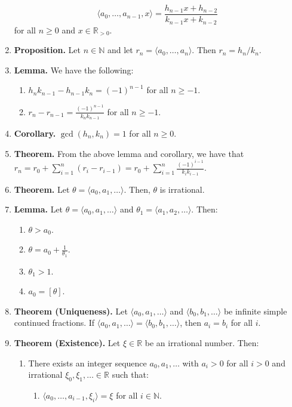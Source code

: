 \documentclass[11pt]{article}
\theoremstyle{definition}
\theoremstyle{named}
\begin{document}
\begin{enumerate}
    $$
    \langle a_0,\dots,a_{n-1},x \rangle = \frac{h_{n-1}x + h_{n-2}}{k_{n-1}x + k_{n-2}}
    $$
    for all $n \geq 0$ and $x \in \mathbb{R}_{>0}$. 
    \item \textbf{Proposition. } Let $n \in \mathbb{N}$ and let $r_n = \langle a_0,\dots,a_n \rangle$. Then $r_n = h_n/k_n$. 
    \item \textbf{Lemma. } We have the following: 
    \begin{enumerate}
        \item $h_nk_{n-1} - h_{n-1}k_n = (-1)^{n-1}$ for all $n \geq -1$. 
        \item $r_n - r_{n-1} = \frac{(-1)^{n-1}}{k_nk_{n-1}}$ for all $n \geq -1$. 
    \end{enumerate}
    \item \textbf{Corollary. } $\gcd(h_n,k_n) = 1$ for all $n \geq 0$. 
    \item \textbf{Theorem. } From the above lemma and corollary, we have that $r_n = r_0 + \sum_{i=1}^{n} (r_i - r_{i-1}) = r_0 + \sum_{i=1}^{n} \frac{(-1)^{i-1}}{k_ik_{i-1}}$. 
    \item \textbf{Theorem. } Let $\theta = \langle a_0,a_1,\dots \rangle$. Then, $\theta$ is irrational. 
    \item \textbf{Lemma. } Let $\theta = \langle a_0,a_1,\dots \rangle$ and $\theta_1 = \langle a_1,a_2,\dots \rangle$. Then: 
    \begin{enumerate}
        \item $\theta > a_0$. 
        \item $\theta = a_0 + \frac{1}{\theta_1}$. 
        \item $\theta_1 > 1$. 
        \item $a_0 = [\theta]$. 
    \end{enumerate}
    \item \textbf{Theorem (Uniqueness). } Let $\langle a_0,a_1,\dots \rangle$ and $\langle b_0,b_1,\dots \rangle$ be infinite simple continued fractions. If $\langle a_0,a_1,\dots \rangle = \langle b_0,b_1,\dots \rangle$, then $a_i = b_i$ for all $i$. 
    \item \textbf{Theorem (Existence). } Let $\xi \in \mathbb{R}$ be an irrational number. Then: 
    \begin{enumerate}
        \item There exists an integer sequence $a_0,a_1,\dots$ with $a_i>0$ for all $i>0$ and irrational $\xi_0,\xi_1,\dots \in \mathbb{R}$ such that:
        \begin{enumerate}
            \item $\langle a_0,\dots,a_{i-1},\xi_i \rangle = \xi$ for all $i \in \mathbb{N}$. 

\end{enumerate}
\end{enumerate}
\end{enumerate}
\end{document}
